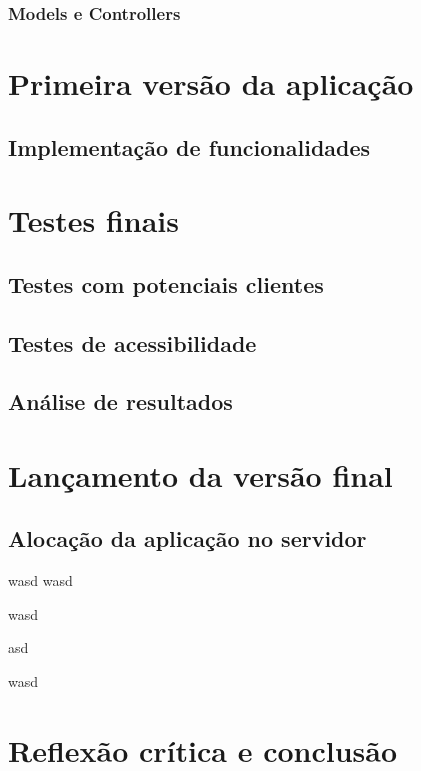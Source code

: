 \documentclass[11pt, twoside]{report}
\begin{document}
	\subsection{Models e Controllers}
	
	\chapter{Primeira versão da aplicação}
	\section{Implementação de funcionalidades}
	
	\chapter{Testes finais}
	\section{Testes com potenciais clientes}
	\section{Testes de acessibilidade}
	\section{Análise de resultados}
	
	\chapter{Lançamento da versão final}
	\section{Alocação da aplicação no servidor}
	
	\pagebreak
	wasd
	wasd
	
	
	wasd
	
	
	\pagebreak
	
	asd
	
	wasd
	\chapter{Reflexão crítica e conclusão}
	
	

	
	
	
\end{document}
